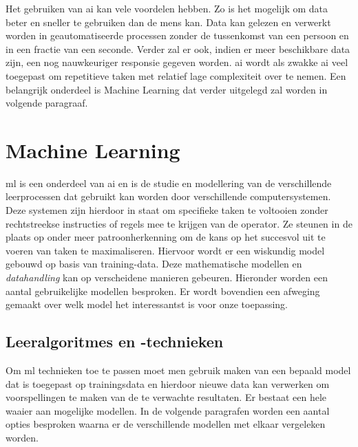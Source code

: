 Het gebruiken van \gls{ai} kan vele voordelen hebben\cite{frankwatching}\cite{SAS}. Zo is het mogelijk om data beter en sneller te gebruiken dan de mens kan. Data kan gelezen en verwerkt worden in geautomatiseerde processen zonder de tussenkomst van een persoon en in een fractie van een seconde. Verder zal er ook, indien er meer beschikbare data zijn, een nog nauwkeuriger responsie gegeven worden. \gls{ai} wordt als zwakke \gls{ai} veel toegepast om repetitieve taken met relatief lage complexiteit over te nemen. Een belangrijk onderdeel is Machine Learning dat verder uitgelegd zal worden in volgende paragraaf.




\newpage

\section{Machine Learning}
\gls{ml} is een onderdeel van \gls{ai} en is de studie en modellering van de verschillende leerprocessen dat gebruikt kan worden door verschillende computersystemen\cite{carbonell1983overview}. Deze systemen zijn hierdoor in staat om specifieke taken te voltooien zonder rechtstreekse instructies of regels mee te krijgen van de operator. Ze steunen in de plaats op onder meer patroonherkenning om de kans op het succesvol uit te voeren van taken te maximaliseren. Hiervoor wordt er een wiskundig model gebouwd op basis van training-data. Deze mathematische modellen en \textit{datahandling} kan op verscheidene manieren gebeuren. Hieronder worden een aantal gebruikelijke modellen besproken. Er wordt bovendien een afweging gemaakt over welk model het interessantst is voor onze toepassing. 

	\subsection{Leeralgoritmes en -technieken}
	Om \gls{ml} technieken toe te passen moet men gebruik maken van een bepaald model dat is toegepast op trainingsdata en hierdoor nieuwe data kan verwerken om voorspellingen te maken van de te verwachte resultaten. Er bestaat een hele waaier aan mogelijke modellen. In de volgende paragrafen worden een aantal opties besproken waarna er de verschillende modellen met elkaar vergeleken worden.
	
